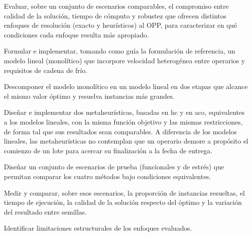 \stopsection

\startsection[title={Objetivo}, reference=sec:objetivo]

\startsubsection[title={Objetivo general}]

Evaluar, sobre un conjunto de escenarios comparables, el compromiso entre
calidad de la solución, tiempo de cómputo y robustez que ofrecen distintos
enfoques de resolución (exacto y heurísticos) al OPP, para caracterizar en
qué condiciones cada enfoque resulta más apropiado.

\stopsubsection

\startsubsection[title={Objetivos específicos}]

\startitemize
	\item Formular e implementar, tomando como guía la formulación de
	referencia, un modelo lineal (monolítico) que incorpore velocidad
	heterogénea entre operarios y requisitos de cadena de frío.
	\item Descomponer el modelo monolítico en un modelo lineal en dos etapas
	que alcance el mismo valor óptimo y resuelva instancias más grandes.
	\item Diseñar e implementar dos metaheurísticas, basadas en \ac{hc} y en
	\ac{aco}, equivalentes a los modelos lineales, con la misma función
	objetivo y las mismas restricciones, de forma tal que sus resultados sean
	comparables. A diferencia de los modelos lineales, las metaheurísticas no
	contemplan que un operario demore a propósito el comienzo de un lote para
	acercar su finalización a la fecha de entrega.
	\item Diseñar un conjunto de escenarios de prueba (funcionales y de estrés)
	que permitan comparar los cuatro métodos bajo condiciones equivalentes.
	\item Medir y comparar, sobre esos escenarios, la proporción de instancias
	resueltas, el tiempo de ejecución, la calidad de la solución respecto
	del óptimo y la variación del resultado entre semillas.
	\item Identificar limitaciones estructurales de los enfoques evaluados.
\stopitemize

\stopsubsection
\stopsection

\startsection[title={Organización del documento}, reference=sec:organizacion]

